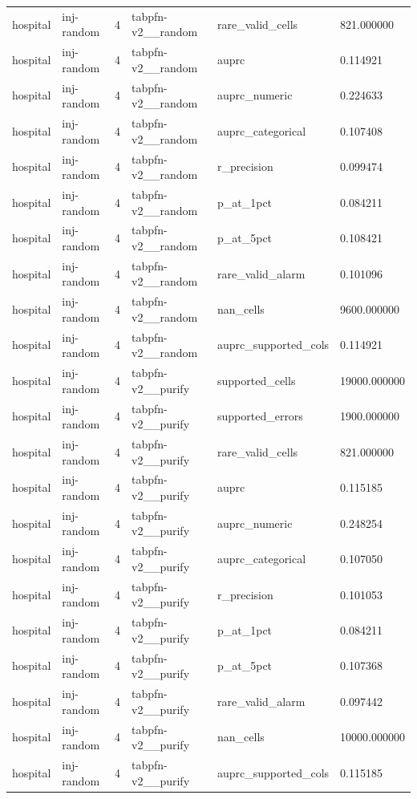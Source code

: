 \begin{tabular}{llllll}
hospital & inj-random & 4 & tabpfn-v2\_\_random & rare\_valid\_cells & 821.000000 \\
hospital & inj-random & 4 & tabpfn-v2\_\_random & auprc & 0.114921 \\
hospital & inj-random & 4 & tabpfn-v2\_\_random & auprc\_numeric & 0.224633 \\
hospital & inj-random & 4 & tabpfn-v2\_\_random & auprc\_categorical & 0.107408 \\
hospital & inj-random & 4 & tabpfn-v2\_\_random & r\_precision & 0.099474 \\
hospital & inj-random & 4 & tabpfn-v2\_\_random & p\_at\_1pct & 0.084211 \\
hospital & inj-random & 4 & tabpfn-v2\_\_random & p\_at\_5pct & 0.108421 \\
hospital & inj-random & 4 & tabpfn-v2\_\_random & rare\_valid\_alarm & 0.101096 \\
hospital & inj-random & 4 & tabpfn-v2\_\_random & nan\_cells & 9600.000000 \\
hospital & inj-random & 4 & tabpfn-v2\_\_random & auprc\_supported\_cols & 0.114921 \\
hospital & inj-random & 4 & tabpfn-v2\_\_purify & supported\_cells & 19000.000000 \\
hospital & inj-random & 4 & tabpfn-v2\_\_purify & supported\_errors & 1900.000000 \\
hospital & inj-random & 4 & tabpfn-v2\_\_purify & rare\_valid\_cells & 821.000000 \\
hospital & inj-random & 4 & tabpfn-v2\_\_purify & auprc & 0.115185 \\
hospital & inj-random & 4 & tabpfn-v2\_\_purify & auprc\_numeric & 0.248254 \\
hospital & inj-random & 4 & tabpfn-v2\_\_purify & auprc\_categorical & 0.107050 \\
hospital & inj-random & 4 & tabpfn-v2\_\_purify & r\_precision & 0.101053 \\
hospital & inj-random & 4 & tabpfn-v2\_\_purify & p\_at\_1pct & 0.084211 \\
hospital & inj-random & 4 & tabpfn-v2\_\_purify & p\_at\_5pct & 0.107368 \\
hospital & inj-random & 4 & tabpfn-v2\_\_purify & rare\_valid\_alarm & 0.097442 \\
hospital & inj-random & 4 & tabpfn-v2\_\_purify & nan\_cells & 10000.000000 \\
hospital & inj-random & 4 & tabpfn-v2\_\_purify & auprc\_supported\_cols & 0.115185 \\

\end{tabular}
